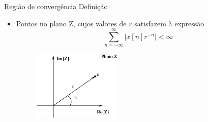 \begin{slide}{Região de convergência}
Definição
   \begin{itemize}
      \item Pontos no plano Z, cujos valores de $r$ satisfazem à expressão 
      \begin{equation*}
           \sum_{n=-\infty}^\infty |x[n]r^{-n}| < \infty
      \end{equation*}
      \begin{figure}
      \centering
      \includegraphics[width=0.4\textwidth]{figs/planoZ}
   \end{figure}
   \end{itemize}
\end{slide}

% 
